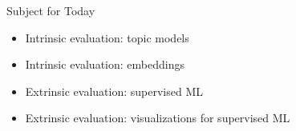 \documentclass[compress]{beamer}
\begin{document}
\begin{frame}{Subject for Today}

  \begin{itemize}
    \item Intrinsic evaluation: topic models
    \item Intrinsic evaluation: embeddings
    \item Extrinsic evaluation: supervised ML
    \item Extrinsic evaluation: visualizations for supervised ML
      \end{itemize}
\end{frame}
\end{document}
